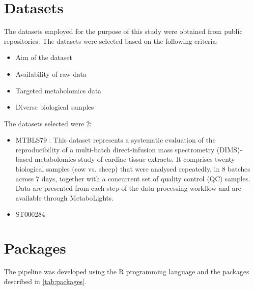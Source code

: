 \documentclass[ENG, BIB]{TFUOC}%
\begin{document}
\section{Datasets} 
The datasets employed for the purpose of this study were obtained from public repositories.
The datasets were selected based on the following criteria:
\begin{itemize}
    \item Aim of the dataset
    \item Availability of raw data
    \item Targeted metabolomics data
    \item Diverse biological samples
\end{itemize}

The datasets selected were 2:
\begin{itemize}
    \item MTBLS79 \cite{kirwanDirectInfusionMass2014}: This dataset represents a systematic evaluation of the reproducibility of a multi-batch direct-infusion mass spectrometry (DIMS)-based metabolomics study of cardiac tissue extracts. It comprises twenty biological samples (cow vs. sheep) that were analysed repeatedly, in 8 batches across 7 days, together with a concurrent set of quality control (QC) samples. Data are presented from each step of the data processing workflow and are available through MetaboLights.
    \item ST000284 \cite{zhuColorectalCancerDetection2014} 

\end{itemize}
\section{Packages} 
The pipeline was developed using the R programming language \cite{R} and the packages described in \ref{tab:packages}.
\end{document}
